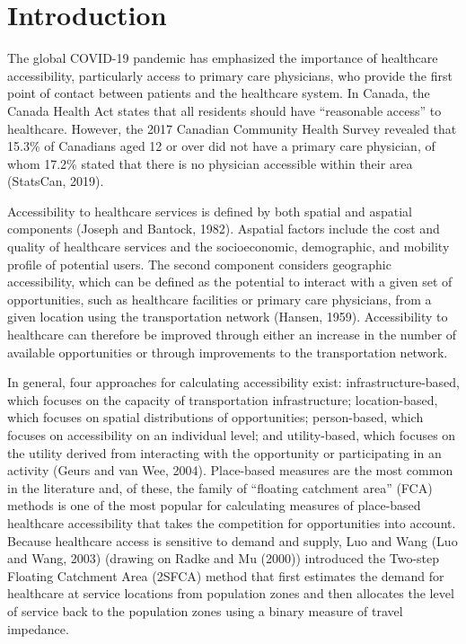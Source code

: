 \documentclass[]{elsarticle} %
\begin{document}
\hypertarget{introduction}{%
\section{Introduction}\label{introduction}}

The global COVID-19 pandemic has emphasized the importance of healthcare
accessibility, particularly access to primary care physicians, who
provide the first point of contact between patients and the healthcare
system. In Canada, the Canada Health Act states that all residents
should have ``reasonable access'' to healthcare. However, the 2017
Canadian Community Health Survey revealed that 15.3\% of Canadians aged
12 or over did not have a primary care physician, of whom 17.2\% stated
that there is no physician accessible within their area (StatsCan,
2019).

Accessibility to healthcare services is defined by both spatial and
aspatial components (Joseph and Bantock, 1982). Aspatial factors include
the cost and quality of healthcare services and the socioeconomic,
demographic, and mobility profile of potential users. The second
component considers geographic accessibility, which can be defined as
the potential to interact with a given set of opportunities, such as
healthcare facilities or primary care physicians, from a given location
using the transportation network (Hansen, 1959). Accessibility to
healthcare can therefore be improved through either an increase in the
number of available opportunities or through improvements to the
transportation network.

In general, four approaches for calculating accessibility exist:
infrastructure-based, which focuses on the capacity of transportation
infrastructure; location-based, which focuses on spatial distributions
of opportunities; person-based, which focuses on accessibility on an
individual level; and utility-based, which focuses on the utility
derived from interacting with the opportunity or participating in an
activity (Geurs and van Wee, 2004). Place-based measures are the most
common in the literature and, of these, the family of ``floating
catchment area'' (FCA) methods is one of the most popular for
calculating measures of place-based healthcare accessibility that takes
the competition for opportunities into account. Because healthcare
access is sensitive to demand and supply, Luo and Wang (Luo and Wang,
2003) (drawing on Radke and Mu (2000)) introduced the Two-step Floating
Catchment Area (2SFCA) method that first estimates the demand for
healthcare at service locations from population zones and then allocates
the level of service back to the population zones using a binary measure
of travel impedance.
\end{document}
